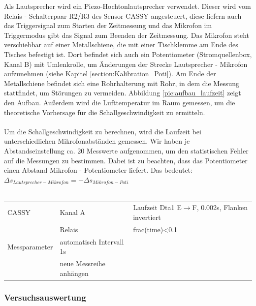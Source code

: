 \documentclass[a4paper]{article}
\begin{document}
	Als Lautsprecher wird ein Piezo-Hochtonlautsprecher verwendet. Dieser wird vom Relais - Schalterpaar R2/R3 des Sensor CASSY angesteuert, diese liefern auch das Triggersignal zum Starten der Zeitmessung und das Mikrofon im Triggermodus gibt das Signal zum Beenden der Zeitmessung. Das Mikrofon steht verschiebbar auf einer Metallschiene, die mit einer Tischklemme am Ende des Tisches befestigt ist. Dort befindet sich auch ein Potentiometer (Stromquellenbox, Kanal B) mit Umlenkrolle, um Änderungen der Strecke Lautsprecher - Mikrofon aufzunehmen (siehe Kapitel \ref{section:Kalibration_Poti}). Am Ende der Metallschiene befindet sich eine Rohrhalterung mit Rohr, in dem die Messung stattfindet, um Störungen zu vermeiden. Abbildung \ref{pic:aufbau_laufzeit} zeigt den Aufbau. Außerdem wird die Lufttemperatur im Raum gemessen, um die theoretische Vorhersage für die Schallgeschwindigkeit zu ermitteln.\\\\
	Um die Schallgeschwindigkeit zu berechnen, wird die Laufzeit bei unterschiedlichen Mikrofonabständen gemessen. Wir haben je Abstandseinstellung ca. 20 Messwerte aufgenommen, um den statistischen Fehler auf die Messungen zu bestimmen. Dabei ist zu beachten, dass das Potentiometer einen Abstand Mikrofon - Potentiometer liefert. Das bedeutet: $\Delta s_{Lautsprecher-Mikrofon} = - \Delta s_{Mikrofon-Poti}$\\\\
	

		\begin{tabular}{l l l}
			CASSY & Kanal A & Laufzeit Dta1 E$\rightarrow$F, 0.002s, Flanken invertiert \\
			&Relais & frac(time)<0.1\\
			Messparameter & automatisch Intervall 1s \\
			& neue Messreihe anhängen
		\end{tabular}

	
	\subsubsection{Versuchsauswertung}
	
\end{document}
